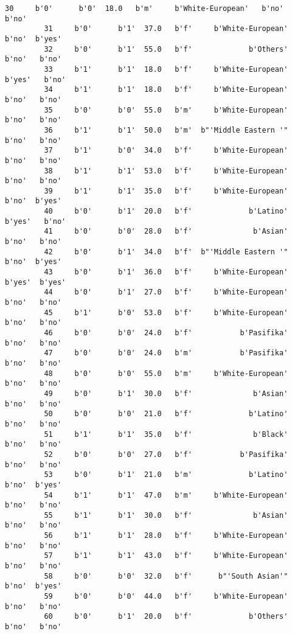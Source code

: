 \documentclass[11pt]{article}
\begin{document}
\begin{Verbatim}[commandchars=\\\{\}]
         30     b'0'      b'0'  18.0   b'm'     b'White-European'   b'no'   b'no'   
         31     b'0'      b'1'  37.0   b'f'     b'White-European'   b'no'  b'yes'   
         32     b'0'      b'1'  55.0   b'f'             b'Others'   b'no'   b'no'   
         33     b'1'      b'1'  18.0   b'f'     b'White-European'  b'yes'   b'no'   
         34     b'1'      b'1'  18.0   b'f'     b'White-European'   b'no'   b'no'   
         35     b'0'      b'0'  55.0   b'm'     b'White-European'   b'no'   b'no'   
         36     b'1'      b'1'  50.0   b'm'  b"'Middle Eastern '"   b'no'   b'no'   
         37     b'1'      b'0'  34.0   b'f'     b'White-European'   b'no'   b'no'   
         38     b'1'      b'1'  53.0   b'f'     b'White-European'   b'no'   b'no'   
         39     b'1'      b'1'  35.0   b'f'     b'White-European'   b'no'  b'yes'   
         40     b'0'      b'1'  20.0   b'f'             b'Latino'  b'yes'   b'no'   
         41     b'0'      b'0'  28.0   b'f'              b'Asian'   b'no'   b'no'   
         42     b'0'      b'1'  34.0   b'f'  b"'Middle Eastern '"   b'no'  b'yes'   
         43     b'0'      b'1'  36.0   b'f'     b'White-European'  b'yes'  b'yes'   
         44     b'0'      b'1'  27.0   b'f'     b'White-European'   b'no'   b'no'   
         45     b'1'      b'0'  53.0   b'f'     b'White-European'   b'no'   b'no'   
         46     b'0'      b'0'  24.0   b'f'           b'Pasifika'   b'no'   b'no'   
         47     b'0'      b'0'  24.0   b'm'           b'Pasifika'   b'no'   b'no'   
         48     b'0'      b'0'  55.0   b'm'     b'White-European'   b'no'   b'no'   
         49     b'0'      b'1'  30.0   b'f'              b'Asian'   b'no'   b'no'   
         50     b'0'      b'0'  21.0   b'f'             b'Latino'   b'no'   b'no'   
         51     b'1'      b'1'  35.0   b'f'              b'Black'   b'no'   b'no'   
         52     b'0'      b'0'  27.0   b'f'           b'Pasifika'   b'no'   b'no'   
         53     b'0'      b'1'  21.0   b'm'             b'Latino'   b'no'  b'yes'   
         54     b'1'      b'1'  47.0   b'm'     b'White-European'   b'no'   b'no'   
         55     b'1'      b'1'  30.0   b'f'              b'Asian'   b'no'   b'no'   
         56     b'1'      b'1'  28.0   b'f'     b'White-European'   b'no'   b'no'   
         57     b'1'      b'1'  43.0   b'f'     b'White-European'   b'no'   b'no'   
         58     b'0'      b'0'  32.0   b'f'      b"'South Asian'"   b'no'  b'yes'   
         59     b'0'      b'0'  44.0   b'f'     b'White-European'   b'no'   b'no'   
         60     b'0'      b'1'  20.0   b'f'             b'Others'   b'no'   b'no'   

\end{Verbatim}
\end{document}
